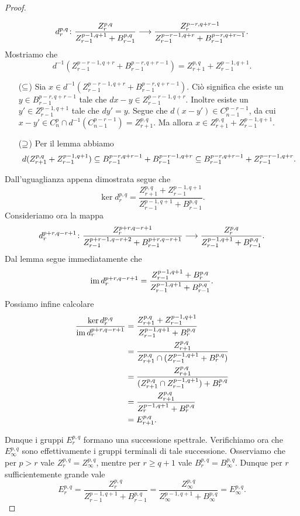 \begin{proof}
\begin{enumerate}
\[
\map{d^{p,q}_r}{\frac{Z^{p,q}_r}{Z^{p-1,q+1}_{r-1}+B^{p,q}_{r-1}}}{\frac{Z^{p-r,q+r-1}_r}{Z^{p-r-1,q+r}_{r-1}+B^{p-r,q+r-1}_{r-1}}}.
\]
Mostriamo che 
\[
d^{-1}(Z^{p-r-1,q+r}_{r-1}+B^{p-r,q+r-1}_{r-1})=Z^{p,q}_{r+1}+Z^{p-1,q+1}_{r-1}.
\]
\begin{itemize}
\item[(\(\subseteq\))] Sia \(x\in d^{-1}(Z^{p-r-1,q+r}_{r-1}+B^{p-r,q+r-1}_{r-1})\). Ciò significa che esiste un \(y\in B^{p-r,q+r-1}_{r-1}\) tale che \(dx-y\in Z^{p-r-1,q+r}_{r-1}\). Inoltre esiste un \(y'\in Z^{p-1,q+1}_{r-1}\) tale che \(dy'=y\). Segue che \(d(x-y')\in C^{p-r-1}_{n-1}\), da cui \(x-y'\in C^p_n\cap d^{-1}(C^{p-r-1}_{n-1})=Z^{p,q}_{r+1}\). Ma allora \(x\in Z^{p,q}_{r+1}+Z^{p-1,q+1}_{r-1}\).
\item[(\(\supseteq\))] Per il lemma abbiamo
\[
d(Z^{p,q}_{r+1}+Z^{p-1,q+1}_{r-1})\subseteq B^{p-r,q+r-1}_{r-1}+B^{p-r-1,q+r}_{r-1}\subseteq B^{p-r,q+r-1}_{r-1}+Z^{p-r-1,q+r}_{r-1}.
\]
\end{itemize}
Dall'uguaglianza appena dimostrata segue che
\[
\ker d^{p,q}_r=\frac{Z^{p,q}_{r+1}+Z^{p-1,q+1}_{r-1}}{Z^{p-1,q+1}_{r-1}+B^{p,q}_{r-1}}.
\]
Consideriamo ora la mappa
\[
\map{d^{p+r,q-r+1}_r}{\frac{Z^{p+r,q-r+1}_r}{Z^{p+r-1,q-r+2}_{r-1}+B^{p+r,q-r+1}_{r-1}}}{\frac{Z^{p,q}_r}{Z^{p-1,q+1}_{r-1}+B^{p,q}_{r-1}}}.
\]
Dal lemma segue immediatamente che
\[
\operatorname{im} d^{p+r,q-r+1}_r=\frac{Z^{p-1,q+1}_{r-1}+B^{p,q}_r}{Z^{p-1,q+1}_{r-1}+B^{p,q}_{r-1}}.
\]
Possiamo infine calcolare
\begin{align*}
\frac{\ker d^{p,q}_r}{\operatorname{im} d^{p+r,q-r+1}_r}&=\frac{Z^{p,q}_{r+1}+Z^{p-1,q+1}_{r-1}}{Z^{p-1,q+1}_{r-1}+B^{p,q}_r}\\
&=\frac{Z^{p,q}_{r+1}}{Z^{p,q}_{r+1}\cap(Z^{p-1,q+1}_{r-1}+B^{p,q}_r)}\\
&=\frac{Z^{p,q}_{r+1}}{(Z^{p,q}_{r+1}\cap Z^{p-1,q+1}_{r-1})+B^{p,q}_r}\\
&=\frac{Z^{p,q}_{r+1}}{Z^{p-1,q+1}_r+B^{p,q}_r}\\
&=E^{p,q}_{r+1}.
\end{align*}
\end{enumerate}
Dunque i gruppi \(E^{p,q}_r\) formano una successione spettrale. Verifichiamo ora che \(E^{p,q}_\infty\) sono effettivamente i gruppi terminali di tale successione. Osserviamo che per \(p>r\) vale \(Z^{p,q}_r=Z^{p,q}_\infty\), mentre per \(r\ge q+1\) vale \(B^{p,q}_r=B^{p,q}_\infty\). Dunque per \(r\) sufficientemente grande vale
\[
E^{p,q}_r=\frac{Z^{p,q}_r}{Z^{p-1,q+1}_{r-1}+B^{p,q}_{r-1}}=\frac{Z^{p,q}_\infty}{Z^{p-1,q+1}_{\infty}+B^{p,q}_\infty}=E^{p,q}_\infty.
\]
\end{proof}
